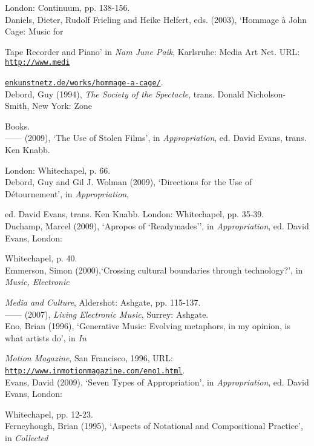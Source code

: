 London: Continuum, pp. 138-156.
\hypertarget{meidenkunst}{}\\
Daniels, Dieter, Rudolf Frieling and Heike Helfert, eds. (2003), `Hommage \`{a} John Cage: Music for 

Tape Recorder and Piano' in \emph{Nam June Paik}, Karlsruhe: Media Art Net. URL: \href{http://www.medienkunstnetz.de/works/hommage-a-cage/}{\texttt{http://www.medi}} 

\href{http://www.medienkunstnetz.de/works/hommage-a-cage/}{\texttt{enkunstnetz.de/works/hommage-a-cage/}}.
\hypertarget{debord}{}\\
Debord, Guy (1994), \emph{The Society of the Spectacle}, trans. Donald Nicholson-Smith, New York: Zone 

Books.
\hypertarget{debord2}{}\\
------ (2009), `The Use of Stolen Films', in \emph{Appropriation}, ed. David Evans, trans. Ken Knabb. 

London: Whitechapel, p. 66.
\hypertarget{debord3}{}\\
Debord, Guy and Gil J. Wolman (2009), `Directions for the Use of D\'{e}tournement', in \emph{Appropriation}, 

ed. David Evans, trans. Ken Knabb. London: Whitechapel, pp. 35-39.
\hypertarget{duchamp}{}\\
Duchamp, Marcel (2009), `Apropos of `Readymades'', in \emph{Appropriation}, ed. David Evans, London: 

Whitechapel, p. 40.
\hypertarget{emmersoncross}{}\\
Emmerson, Simon (2000),`Crossing cultural boundaries through technology?',  in \emph{Music, Electronic}

\emph{Media and Culture}, Aldershot: Ashgate, pp. 115-137. 
\hypertarget{emmersonliving}{}\\
------ (2007), \emph{Living Electronic Music}, Surrey: Ashgate. 
\hypertarget{eno}{}\\
Eno, Brian (1996), `Generative Music: Evolving metaphors, in my opinion, is what artists do', in \emph{In}

\emph{Motion Magazine}, San Francisco, 1996, URL: \href{http://www.inmotionmagazine.com/eno1.html}{\texttt {http://www.inmotionmagazine.com/eno1.html}}.
\hypertarget{evans}{}\\
Evans, David (2009), `Seven Types of Appropriation', in \emph{Appropriation}, ed. David Evans, London: 

Whitechapel, pp. 12-23.
\hypertarget{ferneyhough}{}\\
Ferneyhough, Brian (1995), `Aspects of Notational and Compositional Practice', in \emph{Collected}

